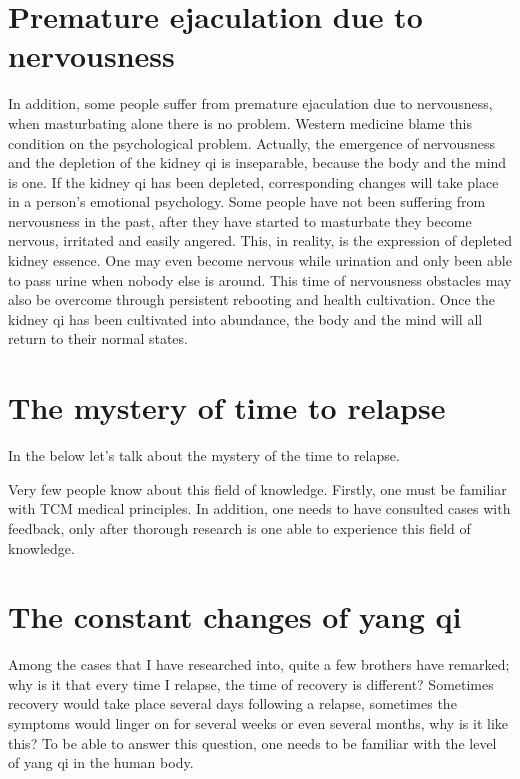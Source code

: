 \documentclass[
]{book}
\begin{document}
\hypertarget{premature-ejaculation-due-to-nervousness}{%
\section{Premature ejaculation due to nervousness}\label{premature-ejaculation-due-to-nervousness}}

In addition, some people suffer from premature ejaculation due to nervousness, when masturbating alone there is no problem. Western medicine blame this condition on the psychological problem. Actually, the emergence of nervousness and the depletion of the kidney qi is inseparable, because the body and the mind is one. If the kidney qi has been depleted, corresponding changes will take place in a person's emotional psychology. Some people have not been suffering from nervousness in the past, after they have started to masturbate they become nervous, irritated and easily angered. This, in reality, is the expression of depleted kidney essence. One may even become nervous while urination and only been able to pass urine when nobody else is around. This time of nervousness obstacles may also be overcome through persistent rebooting and health cultivation. Once the kidney qi has been cultivated into abundance, the body and the mind will all return to their normal states.

\hypertarget{the-mystery-of-time-to-relapse}{%
\section{The mystery of time to relapse}\label{the-mystery-of-time-to-relapse}}

In the below let's talk about the mystery of the time to relapse.

Very few people know about this field of knowledge. Firstly, one must be familiar with TCM medical principles. In addition, one needs to have consulted cases with feedback, only after thorough research is one able to experience this field of knowledge.

\hypertarget{the-constant-changes-of-yang-qi}{%
\section{The constant changes of yang qi}\label{the-constant-changes-of-yang-qi}}

Among the cases that I have researched into, quite a few brothers have remarked; why is it that every time I relapse, the time of recovery is different? Sometimes recovery would take place several days following a relapse, sometimes the symptoms would linger on for several weeks or even several months, why is it like this? To be able to answer this question, one needs to be familiar with the level of yang qi in the human body.
\end{document}
